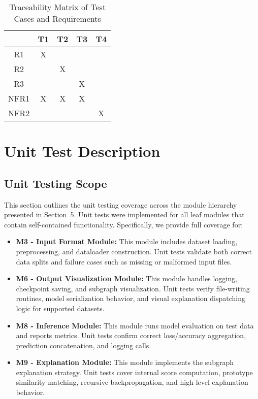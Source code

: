 \documentclass[12pt, titlepage]{article}
\begin{document}
\begin{table}[h!]
  \centering
  \begin{tabular}{|c|c|c|c|c|}
  \hline
    & T1 & T2 & T3 & T4 \\
  \hline
  R1        & X  &   &   &    \\ \hline
  R2        &   & X  &   &   \\ \hline
  R3        &   &   & X  &    \\ \hline
  NFR1      & X  & X  & X  &    \\ \hline
  NFR2      &   &   &   & X   \\ \hline
  \end{tabular}
  \caption{Traceability Matrix of Test Cases and Requirements}
  \label{Table:trace-test-req}
  \end{table}


\section{Unit Test Description}

\subsection{Unit Testing Scope}

This section outlines the unit testing coverage across the module hierarchy presented in Section~5. Unit tests were implemented for all leaf modules that contain self-contained functionality. Specifically, we provide full coverage for:

\begin{itemize}
  \item \textbf{M3 - Input Format Module:} This module includes dataset loading, preprocessing, and dataloader construction. Unit tests validate both correct data splits and failure cases such as missing or malformed input files.
  
  \item \textbf{M6 - Output Visualization Module:} This module handles logging, checkpoint saving, and subgraph visualization. Unit tests verify file-writing routines, model serialization behavior, and visual explanation dispatching logic for supported datasets.
  
  \item \textbf{M8 - Inference Module:} This module runs model evaluation on test data and reports metrics. Unit tests confirm correct loss/accuracy aggregation, prediction concatenation, and logging calls.
  
  \item \textbf{M9 - Explanation Module:} This module implements the subgraph explanation strategy. Unit tests cover internal score computation, prototype similarity matching, recursive backpropagation, and high-level explanation behavior.
\end{itemize}
\end{document}
